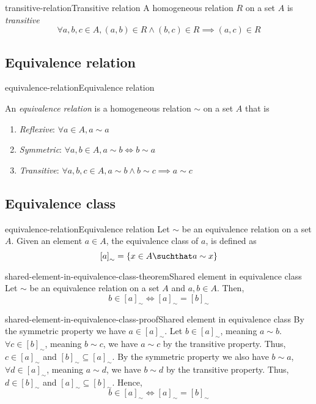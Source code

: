 \documentclass[preview]{standalone}
\begin{document}
\begin{snippetdefinition}{transitive-relation}{Transitive relation}{
    A homogeneous relation \(R\) on a set \(A\) is \textit{transitive}
    \[
        \forall a,b,c \in A, (a,b) \in R \land (b,c) \in R \implies (a,c) \in R 
    \]
}
\end{snippetdefinition}

\subsection{Equivalence relation}

\begin{snippetdefinition}{equivalence-relation}{Equivalence relation}{
    An \textit{equivalence relation} is a homogeneous relation \(\sim\) on a set \(A\)
    that is
    \begin{enumerate}
        \item \textit{Reflexive}: \(\forall a \in A, a \sim a\)
        \item \textit{Symmetric}: \(\forall a,b \in A, a \sim b \iff b \sim a\)
        \item \textit{Transitive}: \(\forall a,b,c \in A, a \sim b \land b \sim c \implies a \sim c\)
    \end{enumerate}
}
\end{snippetdefinition}

\subsection{Equivalence class}

\begin{snippetdefinition}{equivalence-relation}{Equivalence relation}{
    Let \(\sim\) be an equivalence relation on a set \(A\).
    Given an element \(a\in A\), the equivalence class of \(a\), is defined as
    \[
        {[a]}_{\sim} = \{x \in A \suchthat a \sim x\}
    \]
}
\end{snippetdefinition}

\begin{snippettheorem}{shared-element-in-equivalence-class-theorem}{Shared element in equivalence class}{
    Let \(\sim\) be an equivalence relation on a set \(A\)
    and \(a,b \in A\).
    Then,
    \[
        b \in {[a]}_{\sim} \iff {[a]}_{\sim} = {[b]}_{\sim}
    \]
}
\end{snippettheorem}

\begin{snippetproof}{shared-element-in-equivalence-class-proof}{Shared element in equivalence class}{
    By the symmetric property we have \(a \in {[a]}_{\sim}\).
    Let \(b \in {[a]}_{\sim}\), meaning \(a \sim b\). \(\forall c \in {[b]}_{\sim}\),
    meaning \(b \sim c\), we have \(a \sim c\) by the transitive property.
    Thus, \(c \in {[a]}_{\sim}\) and \({[b]}_{\sim} \subseteq {[a]}_{\sim}\).
    By the symmetric property we also have \(b \sim a\),
    \(\forall d \in {[a]}_{\sim}\), meaning \(a \sim d\), we have
    \(b \sim d\) by the transitive property. Thus, \(d \in {[b]}_{\sim}\)
    and \({[a]}_{\sim} \subseteq {[b]}_{\sim}\). Hence,
    \[
        b \in {[a]}_{\sim} \iff {[a]}_{\sim} = {[b]}_{\sim}
    \]
}
\end{snippetproof}
\end{document}
